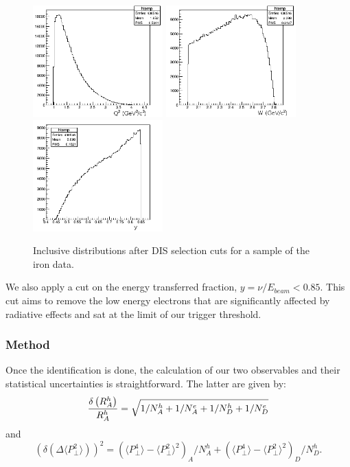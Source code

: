 \begin{figure}[tbp]
\centering
\includegraphics[width=5cm] {answer-fig/DIS-Q2.png} 
\includegraphics[width=5cm] {answer-fig/DIS-w.png} 
\includegraphics[width=5cm] {answer-fig/DIS-y.png} 
\caption {Inclusive distributions after DIS selection cuts for a sample of the iron
data.}
\label{DISKine}
\end{figure}

We also apply a cut on the energy transferred fraction, $y = \nu/E_{beam} < 0.85$. This cut aims to remove the low energy electrons that are significantly affected by radiative effects and sat at the limit of our trigger threshold.

\subsubsection{Method}
\label{RatioCalc}

Once the identification is done, the calculation of our two observables and their statistical uncertainties is straightforward. The latter are given by:
\begin{equation}
{\delta \left ( R_A^h \right ) \over R_A^h} = \sqrt{ 1 /N_A^h + 1/ N_A^e +1/N_D^h + 1/N_D^e}
\end{equation}
and
\begin{equation}
\left ( \delta \left ( \Delta \langle P_\perp^2 \rangle \right ) \right )^2 = 
   \left ({\langle P_\perp^4 \rangle - \langle P_\perp^2 \rangle ^2}\right )_A / N_A^h
 + \left ({\langle P_\perp^4 \rangle - \langle P_\perp^2 \rangle ^2}\right )_D / N_D^h.
\end{equation}


